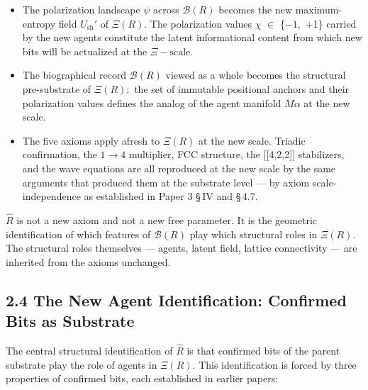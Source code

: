 \documentclass[11pt,oneside]{report}
\theoremstyle{definition}
\theoremstyle{remark}
\begin{document}
\begin{itemize}
\item
  The polarization landscape \ensuremath{\psi} across \ensuremath{\mathcal{B}(R)} becomes the new
  maximum-entropy field \ensuremath{U_{\mathrm{sh}}'} of \ensuremath{\Xi (R).} The polarization values \ensuremath{\chi} \ensuremath{\in} \{\ensuremath{-1,}
  +1\} carried by the new agents constitute the latent informational
  content from which new bits will be actualized at the \ensuremath{\Xi -\text{scale}.}
\end{itemize}

\begin{itemize}
\item
  The biographical record \ensuremath{\mathcal{B}(R)} viewed as a whole becomes the structural
  pre-substrate of \ensuremath{\Xi (R):} the set of immutable positional anchors and
  their polarization values defines the analog of the agent manifold \ensuremath{M\alpha}
  at the new scale.
\end{itemize}

\begin{itemize}
\item
  The five axioms apply afresh to \ensuremath{\Xi (R)} at the new scale. Triadic
  confirmation, the \ensuremath{1\to 4} multiplier, FCC structure, the [[4,2,2]]
  stabilizers, and the wave equations are all reproduced at the new
  scale by the same arguments that produced them at the substrate level
  --- by axiom scale-independence as established in Paper 3 \S\,IV and
  \S\,4.7.
\end{itemize}

\ensuremath{\hat{R}} is not a new axiom and not a new free parameter. It is the geometric
identification of which features of \ensuremath{\mathcal{B}(R)} play which structural roles in
\ensuremath{\Xi (R).} The structural roles themselves --- agents, latent field, lattice
connectivity --- are inherited from the axioms unchanged.

\subsection*{2.4 The New Agent Identification: Confirmed Bits as Substrate}

The central structural identification of \ensuremath{\hat{R}} is that confirmed bits of the
parent substrate play the role of agents in \ensuremath{\Xi (R).} This identification is
forced by three properties of confirmed bits, each established in
earlier papers:
\end{document}
